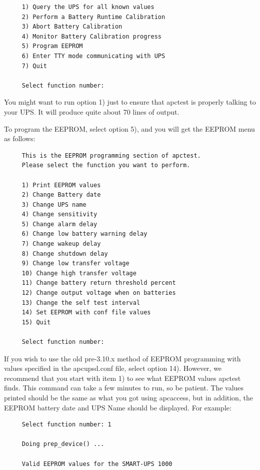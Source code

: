 {{{{{{{{\begin{verbatim}
     1) Query the UPS for all known values
     2) Perform a Battery Runtime Calibration
     3) Abort Battery Calibration
     4) Monitor Battery Calibration progress
     5) Program EEPROM
     6) Enter TTY mode communicating with UPS
     7) Quit
     
     Select function number:
\end{verbatim}
\normalsize

You might want to run option 1) just to ensure that apctest is properly
talking to your UPS. It will produce quite about 70 lines of output.  

To program the EEPROM, select option 5), and you will get the EEPROM menu as
follows: 

\footnotesize
\begin{verbatim}
     This is the EEPROM programming section of apctest.
     Please select the function you want to perform.
     
     1) Print EEPROM values
     2) Change Battery date
     3) Change UPS name
     4) Change sensitivity
     5) Change alarm delay
     6) Change low battery warning delay
     7) Change wakeup delay
     8) Change shutdown delay
     9) Change low transfer voltage
     10) Change high transfer voltage
     11) Change battery return threshold percent
     12) Change output voltage when on batteries
     13) Change the self test interval
     14) Set EEPROM with conf file values
     15) Quit
     
     Select function number:
\end{verbatim}
\normalsize

If you wish to use the old pre-3.10.x method of EEPROM programming with values
specified in the apcupsd.conf file, select option 14). However, we recommend
that you start with item 1) to see what EEPROM values apctest finds. This
command can take a few minutes to run, so be patient. The values printed
should be the same as what you got using apcaccess, but in addition, the
EEPROM battery date and UPS Name should be displayed. For example: 

\footnotesize
\begin{verbatim}
     Select function number: 1
     
     Doing prep_device() ...
     
     Valid EEPROM values for the SMART-UPS 1000
     

\end{verbatim}}}}}}}}}
